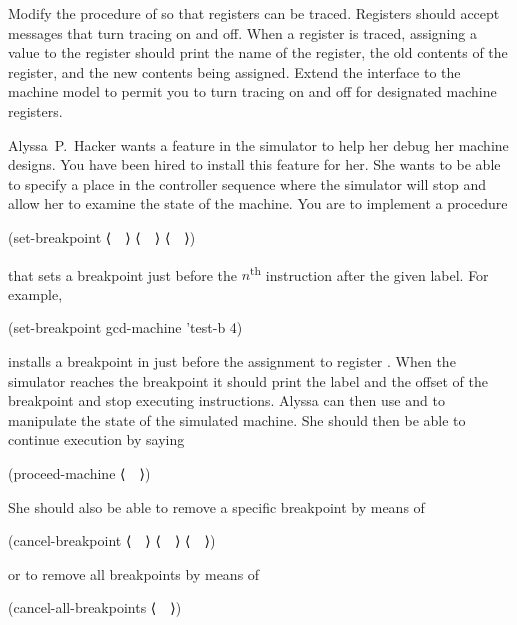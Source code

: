 \begin{exercise}
	\label{Exercise 5.18}
	Modify the  procedure of  so that registers can be traced.
	Registers should accept messages that turn tracing on and off.
	When a register is traced, assigning a value to the register should print the name of the register, the old contents of the register, and the new contents being assigned.
	Extend the interface to the machine model to permit you to turn tracing on and off for designated machine registers.
\end{exercise}



\begin{exercise}
	\label{Exercise 5.19}
	Alyssa P. Hacker wants a  feature in the simulator to help her debug her machine designs.
	You have been hired to install this feature for her.
	She wants to be able to specify a place in the controller sequence where the simulator will stop and allow her to examine the state of the machine.
	You are to implement a procedure
	\begin{scheme}
	  (set-breakpoint ⟨~~⟩ ⟨~~⟩ ⟨~~⟩)
	\end{scheme}
	that sets a breakpoint just before the \( n \)\textsuperscript{th} instruction after the given label.
	For example,
	\begin{scheme}
	  (set-breakpoint gcd-machine 'test-b 4)
	\end{scheme}
	installs a breakpoint in  just before the assignment to register \code{a}.
	When the simulator reaches the breakpoint it should print the label and the offset of the breakpoint and stop executing instructions.
	Alyssa can then use  and  to manipulate the state of the simulated machine.
	She should then be able to continue execution by saying
	\begin{scheme}
	  (proceed-machine ⟨~~⟩)
	\end{scheme}
	She should also be able to remove a specific breakpoint by means of
	\begin{scheme}
	  (cancel-breakpoint ⟨~~⟩ ⟨~~⟩ ⟨~~⟩)
	\end{scheme}
	or to remove all breakpoints by means of
	\begin{scheme}
	  (cancel-all-breakpoints ⟨~~⟩)
	\end{scheme}
\end{exercise}
